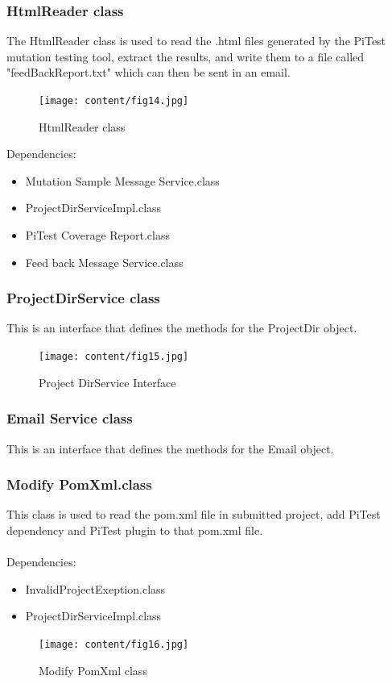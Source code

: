 \subsubsection{HtmlReader class}
The HtmlReader class is used to read the .html files generated by the PiTest mutation testing tool, extract the results, and write them to a file called "feedBackReport.txt" which can then be sent in an email.
\begin{figure}
	\centering
	\texttt{[image: content/fig14.jpg]}
	\caption{HtmlReader class}
	\label{fig:f11}
\end{figure}
\newpage
Dependencies:
\begin{itemize}
\item Mutation Sample Message Service.class
\item ProjectDirServiceImpl.class
\item PiTest Coverage Report.class
\item Feed back Message Service.class
\end{itemize}
\subsubsection{ProjectDirService class}
This is an interface that defines the methods for the ProjectDir object.
\begin{figure}[h!]
	\centering
	\texttt{[image: content/fig15.jpg]}
	\caption{Project DirService Interface}
	\label{fig:f11}
\end{figure}
\subsubsection{Email Service class}
This is an interface that defines the methods for the Email object.
\subsubsection{Modify PomXml.class}
This class is used to read the pom.xml file in submitted project, add PiTest dependency and PiTest plugin to that pom.xml file.\\
\\
Dependencies:
\begin{itemize}
\item InvalidProjectExeption.class
\item ProjectDirServiceImpl.class
\end{itemize}
\begin{figure}[h!]
	\centering
	\texttt{[image: content/fig16.jpg]}
	\caption{Modify PomXml class}
	\label{fig:f11}
\end{figure}

